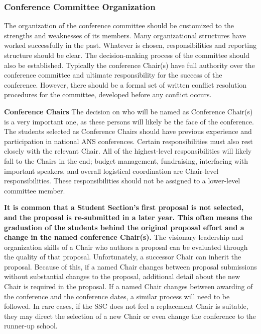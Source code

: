 \documentclass[12pt]{article}
\begin{document}
\subsubsection{Conference Committee Organization}

The organization of the conference committee should be customized to the strengths and
weaknesses of its members. Many organizational structures have worked successfully in the past. Whatever is chosen, responsibilities and reporting structure should be clear. The decision-making process of the committee should also be established. Typically the conference Chair(s) have full authority over the conference committee and ultimate responsibility for the success of the conference. However, there should be a formal set of written conflict resolution procedures for the committee, developed before any conflict occurs.

\textbf{Conference Chairs} The decision on who will be named as Conference Chair(s) is a very important one, as these persons will likely be the face of the conference.
The students selected as Conference Chairs should have previous experience and participation in national ANS conferences.
Certain responsibilities must also rest closely with the relevant Chair. All of the highest-level responsibilities will likely fall to the Chairs in the end; budget management, fundraising, interfacing with important speakers, and overall logistical coordination are Chair-level responsibilities. These responsibilities should not be assigned to a lower-level committee member.

\textbf{It is common that a Student Section’s first proposal is not selected, and the proposal is re-submitted in a later year. This often means the graduation of the students behind the original proposal effort and a change in the named conference Chair(s).} The visionary leadership and organization skills of a Chair who authors a proposal can be evaluated through the quality of that proposal. Unfortunately, a successor Chair can inherit the proposal. Because of this, if a named Chair changes between proposal submissions without substantial changes to the proposal, additional detail about the new Chair is required in the proposal. If a named Chair changes between awarding of the conference and the conference dates, a similar process will need to be followed. In rare cases, if the SSC does not feel a replacement Chair is suitable, they may direct the selection of a new Chair or even change the conference to the runner-up school.
\end{document}
